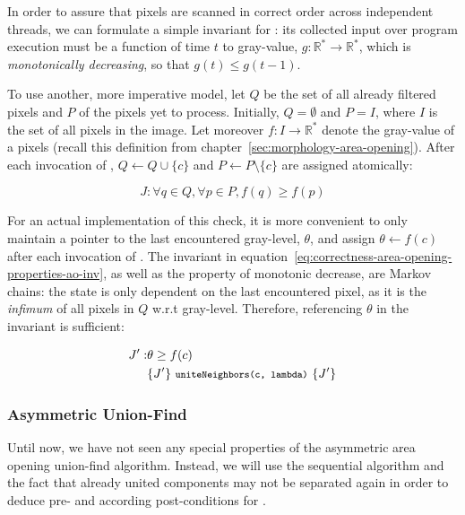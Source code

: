 In order to assure that pixels are scanned in correct order across independent
threads, we can formulate a simple invariant for :
its collected input over program execution must be a function of time $t$ to
gray-value, $g: \mathbb{R}^* \rightarrow \mathbb{R}^*$, which is
\emph{monotonically decreasing}, so that $g(t) \leq g(t - 1)$.

To use another, more imperative model, let $Q$ be the set of all already
filtered pixels and $P$ of the pixels yet to process. Initially, $Q = \emptyset$
and $P = I$, where $I$ is the set of all pixels in the image. Let moreover $f: I
\rightarrow \mathbb{R}^*$ denote the gray-value of a pixels (recall this
definition from chapter~\ref{sec:morphology-area-opening}). After each
invocation of , $Q \leftarrow Q \cup \{c\}$ and $P
\leftarrow P \setminus \{c\}$ are assigned atomically:

\begin{equation}
  \label{eq:correctness-area-opening-properties-ao-inv}
  J: \forall q \in Q, \forall p \in P, f(q) \geq f(p)
\end{equation}

For an actual implementation of this check, it is more convenient to only
maintain a pointer to the last encountered gray-level, $\theta$, and assign
$\theta \leftarrow f(c)$ after each invocation of
. The invariant in
equation~\ref{eq:correctness-area-opening-properties-ao-inv}, as well as the
property of monotonic decrease, are Markov chains: the state is only dependent
on the last encountered pixel, as it is the \emph{infimum} of all pixels in $Q$
w.r.t gray-level. Therefore, referencing $\theta$ in the invariant is
sufficient:

\begin{eqnarray}
  \label{eq:correctness-area-opening-properties-ao-inv2}
  J': & \theta \geq f(c) \\
   & \{J'\} ~ {\footnotesize\texttt{uniteNeighbors(c, lambda)}} ~\{J'\}
\end{eqnarray}

\subsubsection{Asymmetric Union-Find}
\label{sec:correctness-area-opening-properties-uf}

Until now, we have not seen any special properties of the asymmetric area
opening union-find algorithm. Instead, we will use the sequential algorithm and
the fact that already united components may not be separated again in order to
deduce pre- and according post-conditions for .

